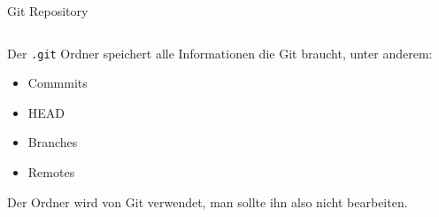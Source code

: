 \documentclass{setbeamer}
\newenvironment{mydirtree}[1][]{
    \begin{tikzpicture}[
        grow via three points = {one child at (0.3,-0.7) and two children at (0.3,-0.7) and (0.3,-1.3)},
        edge from parent path = {(\tikzparentnode.south) circle |- (\tikzchildnode.west)},
        every node/.style = {anchor=west},
        #1
    ]
}{
    \end{tikzpicture}
}
\begin{document}
\begin{frame}[fragile,t]{Git Repository}
    \begin{columns}[c]
        \begin{column}{0.5\textwidth}
        \end{column}

        \begin{column}{0.5\textwidth}
        \end{column}
    \end{columns}

    \vspace{3mm}
    Der \verb|.git| Ordner speichert alle Informationen die Git braucht, unter anderem:
    \begin{itemize}
        \item Commmits
        \item HEAD
        \item Branches
        \item Remotes
    \end{itemize}

    \vspace{3mm}
    Der Ordner wird von Git verwendet, man sollte ihn also nicht bearbeiten.
\end{frame}
\end{document}

